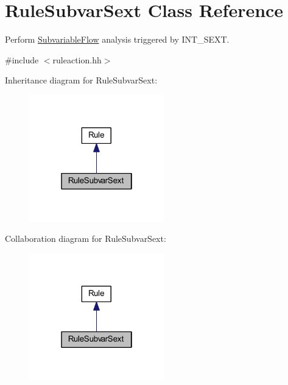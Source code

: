 \hypertarget{class_rule_subvar_sext}{}\section{Rule\+Subvar\+Sext Class Reference}
\label{class_rule_subvar_sext}


Perform \mbox{\hyperlink{class_subvariable_flow}{Subvariable\+Flow}} analysis triggered by I\+N\+T\+\_\+\+S\+E\+XT.  




{\ttfamily \#include $<$ruleaction.\+hh$>$}



Inheritance diagram for Rule\+Subvar\+Sext\+:
\nopagebreak
\begin{figure}[H]
\begin{center}
\leavevmode
\includegraphics[width=166pt]{class_rule_subvar_sext__inherit__graph}
\end{center}
\end{figure}


Collaboration diagram for Rule\+Subvar\+Sext\+:
\nopagebreak
\begin{figure}[H]
\begin{center}
\leavevmode
\includegraphics[width=166pt]{class_rule_subvar_sext__coll__graph}
\end{center}
\end{figure}
